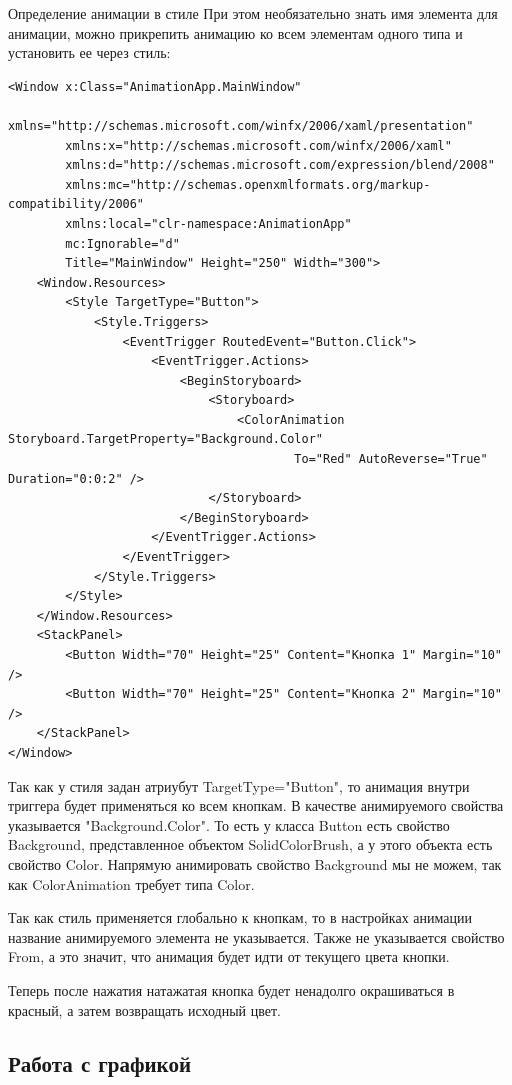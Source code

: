 Определение анимации в стиле
При этом необязательно знать имя элемента для анимации, можно прикрепить анимацию ко всем элементам одного типа и установить ее через стиль:

\begin{verbatim}
<Window x:Class="AnimationApp.MainWindow"
        xmlns="http://schemas.microsoft.com/winfx/2006/xaml/presentation"
        xmlns:x="http://schemas.microsoft.com/winfx/2006/xaml"
        xmlns:d="http://schemas.microsoft.com/expression/blend/2008"
        xmlns:mc="http://schemas.openxmlformats.org/markup-compatibility/2006"
        xmlns:local="clr-namespace:AnimationApp"
        mc:Ignorable="d"
        Title="MainWindow" Height="250" Width="300">
    <Window.Resources>
        <Style TargetType="Button">
            <Style.Triggers>
                <EventTrigger RoutedEvent="Button.Click">
                    <EventTrigger.Actions>
                        <BeginStoryboard>
                            <Storyboard>
                                <ColorAnimation Storyboard.TargetProperty="Background.Color"
                                        To="Red" AutoReverse="True" Duration="0:0:2" />
                            </Storyboard>
                        </BeginStoryboard>
                    </EventTrigger.Actions>
                </EventTrigger>
            </Style.Triggers>
        </Style>
    </Window.Resources>
    <StackPanel>
        <Button Width="70" Height="25" Content="Кнопка 1" Margin="10" />
        <Button Width="70" Height="25" Content="Кнопка 2" Margin="10" />
    </StackPanel>
</Window>
\end{verbatim}

Так как у стиля задан атриубут TargetType="Button", то анимация внутри триггера будет применяться ко всем кнопкам. В качестве анимируемого свойства указывается "Background.Color". То есть у класса Button есть свойство Background, представленное объектом SolidColorBrush, а у этого объекта есть свойство Color. Напрямую анимировать свойство Background мы не можем, так как ColorAnimation требует типа Color.

Так как стиль применяется глобально к кнопкам, то в настройках анимации название анимируемого элемента не указывается. Также не указывается свойство From, а это значит, что анимация будет идти от текущего цвета кнопки.

Теперь после нажатия натажатая кнопка будет ненадолго окрашиваться в красный, а затем возвращать исходный цвет.

\subsection{Работа с графикой}

